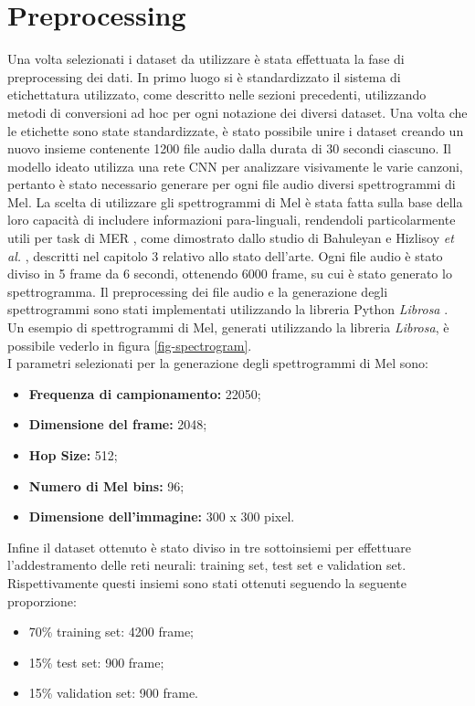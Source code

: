 \documentclass[11pt]{report}
\begin{document}
\newpage

\section{Preprocessing}

Una volta selezionati i dataset da utilizzare è stata effettuata la fase di preprocessing dei dati. In primo luogo si è standardizzato il sistema di etichettatura utilizzato, come descritto nelle sezioni precedenti, utilizzando metodi di conversioni ad hoc per ogni notazione dei diversi dataset. Una volta che le etichette sono state standardizzate, è stato possibile unire i dataset creando un nuovo insieme contenente 1200 file audio dalla durata di 30 secondi ciascuno. Il modello ideato utilizza una rete CNN per analizzare visivamente le varie canzoni, pertanto è stato necessario generare per ogni file audio diversi spettrogrammi di Mel. La scelta di utilizzare gli spettrogrammi di Mel è stata fatta sulla base della loro capacità di includere informazioni para-linguali, rendendoli particolarmente utili per task di MER \cite{ma2018emotion}, come dimostrato dallo studio di Bahuleyan \cite{bahuleyan2018music} e Hizlisoy \textit{et al.} \cite{hizlisoy2021music}, descritti nel capitolo 3 relativo allo stato dell'arte. Ogni file audio è stato diviso in 5 frame da 6 secondi, ottenendo 6000 frame, su cui è stato generato lo spettrogramma. Il preprocessing dei file audio e la generazione degli spettrogrammi sono stati implementati utilizzando la libreria Python \textit{Librosa} \cite{mcfee2015librosa}. Un esempio di spettrogrammi di Mel, generati utilizzando la libreria \textit{Librosa}, è possibile vederlo in figura \ref{fig-spectrogram}.\\


I parametri selezionati per la generazione degli spettrogrammi di Mel sono:
\begin{itemize}
    \item \textbf{Frequenza di campionamento:} 22050;
    \item \textbf{Dimensione del frame:} 2048;
    \item \textbf{Hop Size:} 512;
    \item \textbf{Numero di Mel bins:} 96;
    \item \textbf{Dimensione dell'immagine:} 300 x 300 pixel.
\end{itemize}

Infine il dataset ottenuto è stato diviso in tre sottoinsiemi per effettuare l'addestramento delle reti neurali: training set, test set e validation set. Rispettivamente questi insiemi sono stati ottenuti seguendo la seguente proporzione:
\begin{itemize}
    \item 70\% training set: 4200 frame;
    \item 15\% test set: 900 frame;
        \item 15\% validation set: 900 frame.
\end{itemize}
\end{document}
